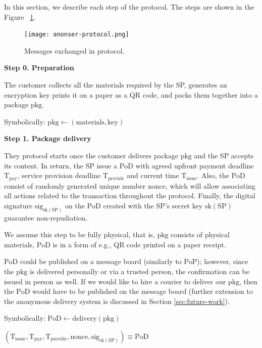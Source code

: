 \documentclass{ieeeaccess}
\begin{document}
In this section, we describe each step of the protocol. The steps are
shown in the Figure ~\ref{fig:protocol-diagram}.

\begin{figure}[h!]
\texttt{[image: anonser-protocol.png]}
\centering
\caption{Messages exchanged in protocol.}
\label{fig:protocol-diagram}
\end{figure}

\noindent \textbf
{Step 0.  Preparation}\label{step-0-preparation}

The customer collects all the $\mathrm{materials}$ required by the SP, generates an encryption $\mathrm{key}$ prints it on a paper as a QR code, and packs them together into a package $\mathrm{pkg}$.

Symbolically: 
$
\mathrm{pkg} \gets (\mathrm{materials}, \mathrm{key})
$

\noindent \textbf
{Step 1. Package delivery}\label{step-1-package-delivery}

They protocol starts once the customer delivers package $\mathrm{pkg}$ and the SP accepts its content. In return, the SP issue a $\mathrm{PoD}$ with agreed upfront payment deadline $\mathrm{T}_\mathrm{pay}$, service provision deadline $\mathrm{T}_\mathrm{provide}$ and current time $\mathrm{T}_\mathrm{issue}$. Also, the $\mathrm{PoD}$ consist of randomly generated unique number $\mathrm{nonce}$, which will allow associating all actions related to the transaction throughout the protocol. Finally, the digital signature $\mathrm{sig}_{\mathrm{sk}(\mathrm{SP})}$ on the $\mathrm{PoD}$ created with the SP's secret key $\mathrm{sk}(\mathrm{SP})$ guarantee non-repudiation.

We assume this step to be fully physical, that is, $\mathrm{pkg}$ consists of physical materials, $\mathrm{PoD}$ is in a form of e.g., QR code printed on a paper receipt. 

$\mathrm{PoD}$ could be published on a message board (similarly to $\mathrm{PoP}$); however, since the $\mathrm{pkg}$ is delivered personally or via a trusted person, the confirmation can be issued in person as well. If we would like to hire a courier to deliver our $\mathrm{pkg}$, then the $\mathrm{PoD}$ would have to be published on the message board (further extension to the anonymous delivery system is discussed in Section \ref{sec:future-work}).

Symbolically: 
$
\mathrm{PoD} \gets \mathrm{delivery}(\mathrm{pkg})
$

$
(\mathrm{T}_\mathrm{issue}, \mathrm{T}_\mathrm{pay}, \mathrm{T}_\mathrm{provide}, \mathrm{nonce}, \mathrm{sig}_{\mathrm{sk}(\mathrm{SP})}) \equiv \mathrm{PoD}
$
\end{document}
